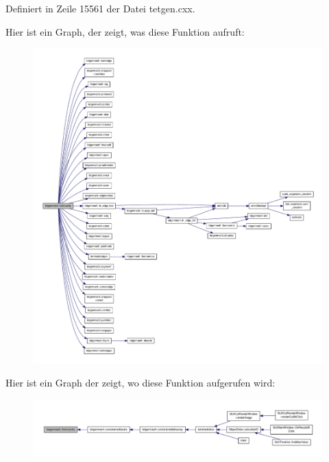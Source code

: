 Definiert in Zeile 15561 der Datei tetgen.\-cxx.



Hier ist ein Graph, der zeigt, was diese Funktion aufruft\-:
\nopagebreak
\begin{figure}[H]
\begin{center}
\leavevmode
\includegraphics[width=350pt]{classtetgenmesh_a3b116575f33fc21499796663ed1f9461_cgraph}
\end{center}
\end{figure}




Hier ist ein Graph der zeigt, wo diese Funktion aufgerufen wird\-:
\nopagebreak
\begin{figure}[H]
\begin{center}
\leavevmode
\includegraphics[width=350pt]{classtetgenmesh_a3b116575f33fc21499796663ed1f9461_icgraph}
\end{center}
\end{figure}


